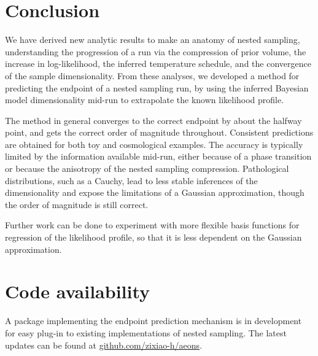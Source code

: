\documentclass[usenatbib]{mnras}
\begin{document}
\section{Conclusion}
We have derived new analytic results to make an anatomy of nested sampling, understanding the progression of a run via the compression of prior volume, the increase in log-likelihood, the inferred temperature schedule, and the convergence of the sample dimensionality. From these analyses, we developed a method for predicting the endpoint of a nested sampling run, by using the inferred Bayesian model dimensionality mid-run to extrapolate the known likelihood profile. 
\par
The method in general converges to the correct endpoint by about the halfway point, and gets the correct order of magnitude throughout. Consistent predictions are obtained for both toy and cosmological examples. The accuracy is typically limited by the information available mid-run, either because of a phase transition or because the anisotropy of the nested sampling compression. Pathological distributions, such as a Cauchy, lead to less stable inferences of the dimensionality and expose the limitations of a Gaussian approximation, though the order of magnitude is still correct.
\par
Further work can be done to experiment with more flexible basis functions for regression of the likelihood profile, so that it is less dependent on the Gaussian approximation.

\section{Code availability}
A package implementing the endpoint prediction mechanism is in development for easy plug-in to existing implementations of nested sampling. The latest updates can be found at \href{https://github.com/zixiao-h/aeons}{github.com/zixiao-h/aeons}.




\label{lastpage}
\end{document}
